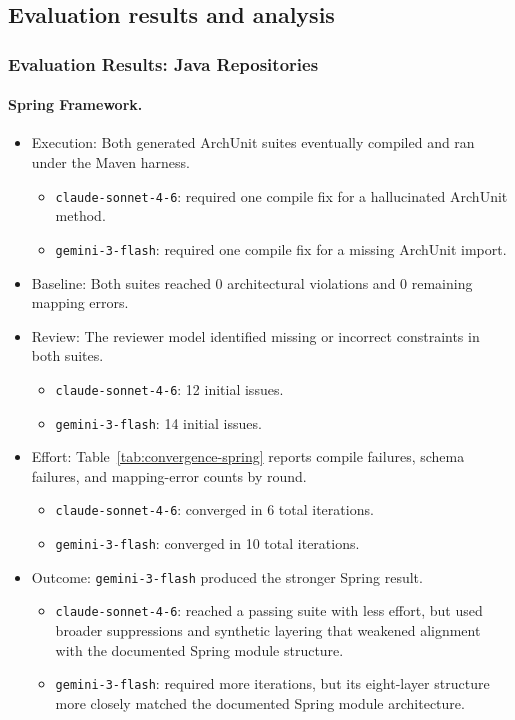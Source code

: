 \documentclass[sigconf,screen]{acmart}
\begin{document}
\subsection{Evaluation results and analysis}
\subsubsection{Evaluation Results: Java Repositories}

\paragraph{Spring Framework.}
\begin{itemize}
    \item Execution: Both generated ArchUnit suites eventually compiled and ran under the Maven harness.
    \begin{itemize}
        \item \texttt{claude-sonnet-4-6}: required one compile fix for a hallucinated ArchUnit method.
        \item \texttt{gemini-3-flash}: required one compile fix for a missing ArchUnit import.
    \end{itemize}
    \item Baseline: Both suites reached 0 architectural violations and 0 remaining mapping errors.
    \item Review: The reviewer model identified missing or incorrect constraints in both suites.
    \begin{itemize}
        \item \texttt{claude-sonnet-4-6}: 12 initial issues.
        \item \texttt{gemini-3-flash}: 14 initial issues.
    \end{itemize}
    \item Effort: Table~\ref{tab:convergence-spring} reports compile failures, schema failures, and mapping-error counts by round.
    \begin{itemize}
        \item \texttt{claude-sonnet-4-6}: converged in 6 total iterations.
        \item \texttt{gemini-3-flash}: converged in 10 total iterations.
    \end{itemize}
    \item Outcome: \texttt{gemini-3-flash} produced the stronger Spring result.
    \begin{itemize}
        \item \texttt{claude-sonnet-4-6}: reached a passing suite with less effort, but used broader suppressions and synthetic layering that weakened alignment with the documented Spring module structure.
        \item \texttt{gemini-3-flash}: required more iterations, but its eight-layer structure more closely matched the documented Spring module architecture.
    \end{itemize}
\end{itemize}
\end{document}
